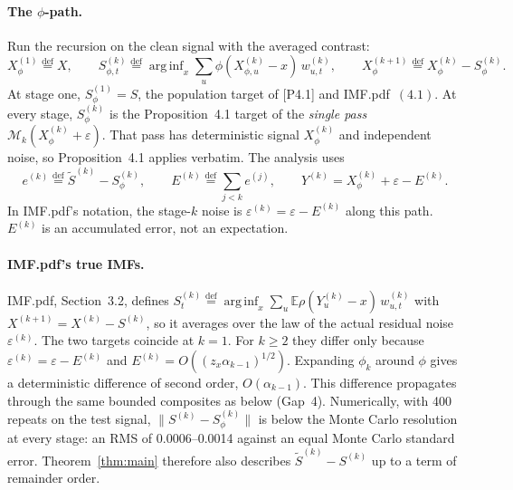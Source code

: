 \documentclass[11pt]{article}
\newcommand{\E}{\mathbb{E}}
\newcommand{\defeq}{\stackrel{\mathrm{def}}{=}}
\newcommand{\arginf}{\mathop{\mathrm{arg\,inf}}}
\newcommand{\norm}[1]{\lVert#1\rVert}
\newcommand{\IMFt}{\widetilde S}
\theoremstyle{definition}
\begin{document}
\paragraph{The \(\phi\)-path.}  Run the recursion on the clean signal with the
averaged contrast:
\[
  X^{(1)}_\phi\defeq X,\qquad
  S^{(k)}_{\phi,t}\defeq\arginf_x\sum_u\phi(X^{(k)}_{\phi,u}-x)\,w^{(k)}_{u,t},\qquad
  X^{(k+1)}_\phi\defeq X^{(k)}_\phi-S^{(k)}_\phi .
\]
At stage one, \(S^{(1)}_\phi=S\), the population target of
[P4.1] and IMF.pdf~\((4.1)\).  At every stage, \(S^{(k)}_\phi\) is the
Proposition~4.1 target of the \emph{single pass}
\(\mathcal M_k(X^{(k)}_\phi+\varepsilon)\).  That pass has deterministic signal
\(X^{(k)}_\phi\) and independent noise, so Proposition~4.1 applies verbatim.
The analysis uses
\[
  e^{(k)}\defeq\IMFt^{(k)}-S^{(k)}_\phi,\qquad
  E^{(k)}\defeq\sum_{j<k}e^{(j)},\qquad
  Y^{(k)}=X^{(k)}_\phi+\varepsilon-E^{(k)} .
\]
In IMF.pdf's notation, the stage-\(k\) noise is
\(\varepsilon^{(k)}=\varepsilon-E^{(k)}\) along this path.  \(E^{(k)}\) is an
accumulated error, not an expectation.

\paragraph{IMF.pdf's true IMFs.}  IMF.pdf, Section~3.2, defines
\(S^{(k)}_t\defeq\arginf_x\sum_u\E\rho(Y^{(k)}_u-x)\,w^{(k)}_{u,t}\) with
\(X^{(k+1)}=X^{(k)}-S^{(k)}\), so it averages over the law of the actual
residual noise \(\varepsilon^{(k)}\).  The two targets coincide at \(k=1\).
For \(k\ge2\) they differ only because \(\varepsilon^{(k)}=\varepsilon-E^{(k)}\)
and \(E^{(k)}=O((z_x\alpha_{k-1})^{1/2})\).  Expanding \(\phi_k\) around
\(\phi\) gives a deterministic difference of second order,
\(O(\alpha_{k-1})\).  This difference propagates through the same bounded
composites as below (Gap~4).  Numerically, with 400 repeats on the test
signal, \(\norm{S^{(k)}-S^{(k)}_\phi}\) is below the Monte Carlo resolution
at every stage: an RMS of 0.0006--0.0014 against an equal Monte Carlo
standard error.  Theorem~\ref{thm:main} therefore also describes
\(\IMFt^{(k)}-S^{(k)}\) up to a term of remainder order.
\end{document}
